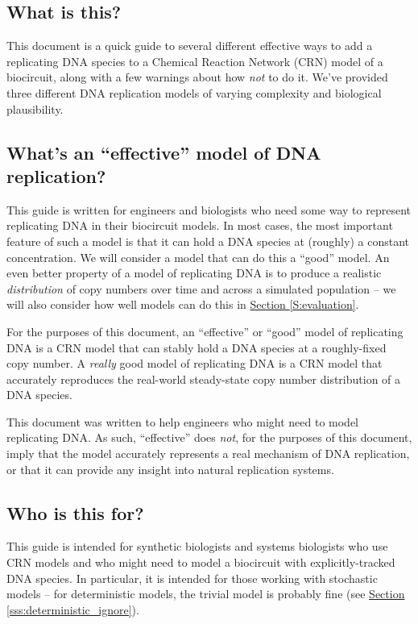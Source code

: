 \documentclass[preprint,12pt]{oldplainarticle}
\begin{document}
\subsection{What is this?}

This document is a quick guide to several different effective ways to add a replicating DNA species to a Chemical Reaction Network (CRN) model of a biocircuit, along with a few warnings about how \emph{not} to do it. We've provided three different DNA replication models of varying complexity and biological plausibility.

\subsection{What's an ``effective'' model of DNA replication?}

This guide is written for engineers and biologists who need some way to represent replicating DNA in their biocircuit models. In most cases, the most important feature of such a model is that it can hold a DNA species at (roughly) a constant concentration. We will consider a model that can do this a ``good'' model. An even better property of a model of replicating DNA is to produce a realistic \emph{distribution} of copy numbers over time and across a simulated population -- we will also consider how well models can do this in \hyperref[S:evaluation]{Section \ref{S:evaluation}}.

For the purposes of this document, an ``effective'' or ``good'' model of replicating DNA is a CRN model that can stably hold a DNA species at a roughly-fixed copy number. A \emph{really} good model of replicating DNA is a CRN model that accurately reproduces the real-world steady-state copy number distribution of a DNA species. 

This document was written to help engineers who might need to model replicating DNA. As such, ``effective'' does \emph{not}, for the purposes of this document, imply that the model accurately represents a real mechanism of DNA replication, or that it can provide any insight into natural replication systems. 

\subsection{Who is this for?}

This guide is intended for synthetic biologists and systems biologists who use CRN models and who might need to model a biocircuit with explicitly-tracked DNA species. In particular, it is intended for those working with stochastic models -- for deterministic models, the trivial model is probably fine (see \hyperref[sss:deterministic_ignore]{Section \ref{sss:deterministic_ignore}}).
\end{document}
